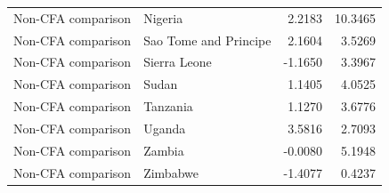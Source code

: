 \begin{table}
\begin{tabular}[t]{llrr}
Non-CFA comparison & Nigeria & 2.2183 & 10.3465\\
Non-CFA comparison & Sao Tome and Principe & 2.1604 & 3.5269\\
Non-CFA comparison & Sierra Leone & -1.1650 & 3.3967\\
\addlinespace
Non-CFA comparison & Sudan & 1.1405 & 4.0525\\
Non-CFA comparison & Tanzania & 1.1270 & 3.6776\\
Non-CFA comparison & Uganda & 3.5816 & 2.7093\\
Non-CFA comparison & Zambia & -0.0080 & 5.1948\\
Non-CFA comparison & Zimbabwe & -1.4077 & 0.4237\\
\bottomrule
\end{tabular}
\end{table}